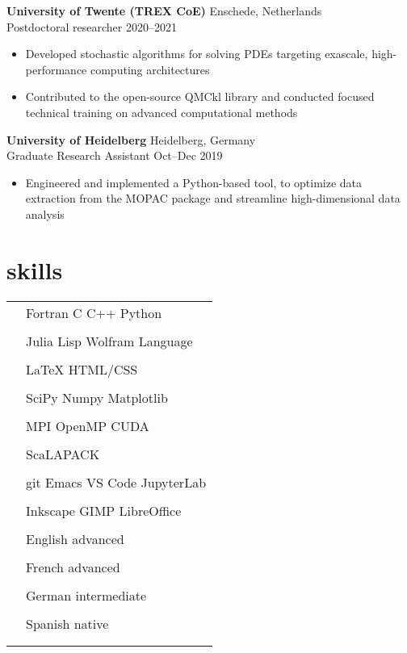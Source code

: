\documentclass[12pt]{article}
\newcommand{\entry}[4]{{{\textbf{#1}}} \hfill #3 \\ #2 \hfill #4}
\newcommand{\tableentry}[3]{\textsc{#1} & #2\expandafter\ifstrequal\expandafter{#3}{}{\\}{\\[6pt]}}
\begin{document}
\begin{paracol}{2}
    \medskip

    \entry{University of Twente (TREX CoE)}{Postdoctoral researcher}{Enschede, Netherlands}{2020--2021}
    \begin{itemize}[noitemsep,leftmargin=3.5mm,rightmargin=0mm,topsep=6pt]
    \item Developed stochastic algorithms for solving PDEs targeting exascale, high-performance computing architectures
    \item Contributed to the open-source QMCkl library and conducted focused technical training on advanced computational methods
    \end{itemize}

    \medskip

    \entry{University of Heidelberg}{Graduate Research Assistant}{Heidelberg, Germany}{Oct--Dec 2019}
    \begin{itemize}[noitemsep,leftmargin=3.5mm,rightmargin=0mm,topsep=6pt]
    \item Engineered and implemented a Python-based tool, to optimize data extraction from the MOPAC package and streamline high-dimensional data analysis
    \end{itemize}

    \switchcolumn{}

    \section{skills}
    \begin{supertabular}{rl}
      \tableentry{\footnotesize\faCode}{Fortran \textperiodcentered{} C
        \textperiodcentered{} C++ \textperiodcentered{} Python}{}
      \tableentry{}{Julia \textperiodcentered{} Lisp \textperiodcentered{} Wolfram Language}{}
      \tableentry{}{LaTeX \textperiodcentered{} HTML/CSS}{}
      \tableentry{\footnotesize\faCogs}{SciPy \textperiodcentered{} Numpy \textperiodcentered{} Matplotlib}{}
      \tableentry{}{MPI \textperiodcentered{} OpenMP \textperiodcentered{} CUDA}{}
      \tableentry{}{ScaLAPACK}{}
      \tableentry{\footnotesize\faLaptop}{git\textperiodcentered{}  Emacs \textperiodcentered{} VS Code \textperiodcentered{} JupyterLab}{}
      \tableentry{}{Inkscape \textperiodcentered{} GIMP \textperiodcentered{}  LibreOffice}{}

      \tableentry{\footnotesize\faLanguage}{English \textperiodcentered{} advanced}{}
      \tableentry{}{French \textperiodcentered{} advanced}{}
      \tableentry{}{German \textperiodcentered{} intermediate}{}
      \tableentry{}{Spanish \textperiodcentered{} native}{}
    \end{supertabular}


\end{paracol}
\end{document}
